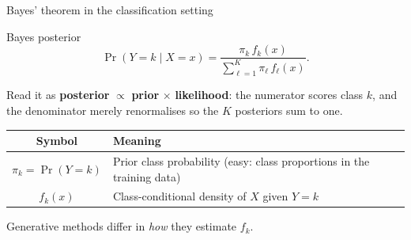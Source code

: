 \documentclass[aspectratio=169,11pt]{beamer}
\begin{document}
\begin{frame}{Bayes' theorem in the classification setting}
  \begin{block}{Bayes posterior}
    \[
      \boxed{\;
        \Pr(Y = k \mid X = x)
          = \frac{\pi_k\, f_k(x)}{\sum_{\ell=1}^K \pi_\ell\, f_\ell(x)}.
      \;}
    \]
  \end{block}
  Read it as \textbf{posterior} $\propto$ \textbf{prior} $\times$
  \textbf{likelihood}: the numerator scores class $k$, and the
  denominator merely renormalises so the $K$ posteriors sum to one.
  \begin{readme}
    \begin{tabular}{@{}cl@{}}
      \toprule
      \textbf{Symbol} & \textbf{Meaning} \\
      \midrule
      $\pi_k = \Pr(Y = k)$ & Prior class probability (easy: class
                              proportions in the training data) \\
      $f_k(x)$ & Class-conditional density of $X$ given $Y = k$ \\
      \bottomrule
    \end{tabular}
  \end{readme}
  Generative methods differ in \emph{how} they estimate $f_k$.
\end{frame}
\end{document}
